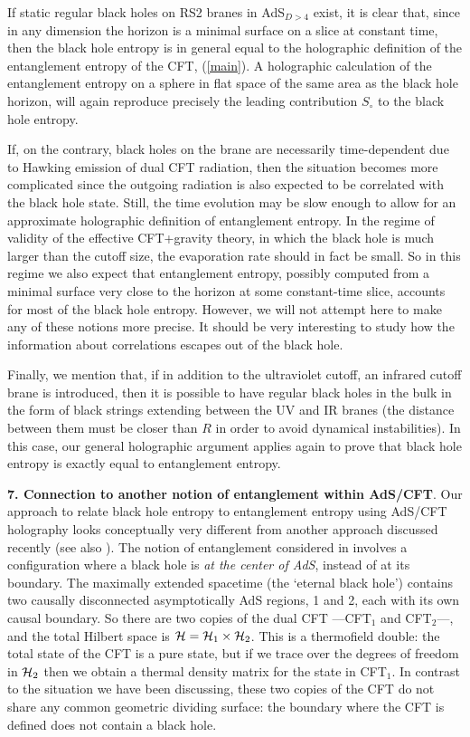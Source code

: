 \documentclass[12pt]{article}
\newcommand{\reef}[1]{(\ref{#1})}
\begin{document}
If static regular black holes on RS2 branes in AdS$_{D>4}$ exist,
it is clear that, since in any dimension the horizon is a minimal
surface on a slice at constant time, then the black hole entropy is in
general equal to the holographic definition of the entanglement entropy
of the CFT, \reef{main}. A holographic calculation of the entanglement
entropy on a sphere in flat space of the same area as the black hole
horizon, will again reproduce precisely the leading contribution
$S_{\circ}$ to the black hole entropy. 

If, on the contrary, black holes on the brane are necessarily
time-dependent due to Hawking emission of dual CFT radiation, then the
situation becomes more complicated since the outgoing radiation is also
expected to be correlated with the black hole state. Still, the time
evolution may be slow enough to allow for an approximate holographic
definition of entanglement entropy. In the regime of validity of the
effective CFT+gravity theory, in which the black hole is much larger
than the cutoff size, the evaporation rate should in fact be small. So
in this regime we also expect that entanglement entropy, possibly
computed from a minimal surface very close to the horizon at some
constant-time slice, accounts for most of the black hole entropy.
However, we will not attempt here to make any of these notions more
precise. It should be very interesting to study how the information
about correlations escapes out of the black hole. 

Finally, we mention that, if in addition to the ultraviolet cutoff, an
infrared cutoff brane is introduced, then it is possible to have regular
black holes in the bulk in the form of black strings extending between
the UV and IR branes (the distance between them must be closer than $R$
in order to avoid dynamical instabilities). In this case, our general
holographic argument applies again to prove that black hole entropy is
exactly equal to entanglement entropy.


\bigskip

\noindent\textbf{7. Connection to another notion of
entanglement within AdS/CFT}. Our approach to relate
black hole entropy to entanglement entropy using AdS/CFT holography
looks conceptually very different from another approach discussed
recently \cite{malda} (see also \cite{brus}). The notion of entanglement
considered in \cite{malda} involves a configuration where a black hole
is {\it at the center of AdS}, instead of at its boundary. The maximally
extended spacetime (the `eternal black hole') contains two causally
disconnected asymptotically AdS regions, 1 and 2, each with its own
causal boundary. So there are two copies of the dual CFT ---CFT$_1$ and
CFT$_2$---, and the total Hilbert space is ${\cal H}={\cal
H}_1\times{\cal H}_2$. This is a thermofield double: the total state of
the CFT is a pure state, but if we trace
over the degrees of freedom in ${\cal H}_2$ then we obtain a thermal
density matrix for the state in CFT$_1$. In contrast to the situation we
have been discussing, these two copies of the CFT do not share any
common geometric dividing surface: the boundary where the CFT is defined
does not contain a black hole.
\end{document}
